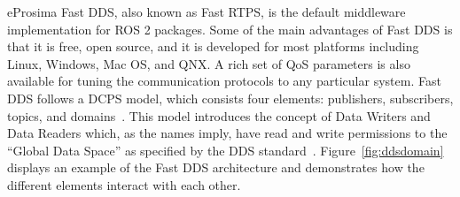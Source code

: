     eProsima Fast \ac{DDS}, also known as Fast \ac{RTPS}, is the default middleware implementation for \ac{ROS} 2 packages. Some of the main advantages of Fast \ac{DDS} is that it is free, open source, and it is developed for most platforms including Linux, Windows, Mac OS, and QNX. A rich set of \ac{QoS} parameters is also available for tuning the communication protocols to any particular system. Fast \ac{DDS} follows a \ac{DCPS} model, which consists four elements: publishers, subscribers, topics, and domains~\cite{dcps}. This model introduces the concept of \textsf{Data Writers} and \textsf{Data Readers} which, as the names imply, have read and write permissions to the ``Global Data Space'' as specified by the \ac{DDS} standard~\cite{introdds}. Figure~\ref{fig:ddsdomain} displays an example of the Fast \ac{DDS} architecture and demonstrates how the different elements interact with each other.

